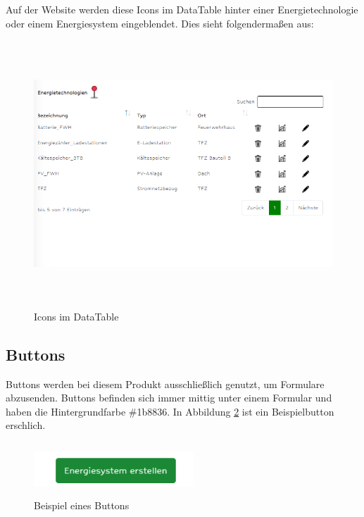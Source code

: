 Auf der Website werden diese Icons im DataTable hinter einer Energietechnologie oder einem Energiesystem eingeblendet. Dies sieht folgendermaßen aus:
\begin{figure}[h]
	\centering
	\includegraphics[height=10cm,width=15cm]{images/IconsImDatatable}
	\caption{Icons im DataTable}
	\label{fig: Icons im Datatable}
\end{figure}


\subsection{Buttons}
Buttons werden bei diesem Produkt ausschließlich genutzt, um Formulare abzusenden. Buttons befinden sich immer mittig unter einem Formular und  haben die Hintergrundfarbe \#1b8836. In Abbildung \ref{fig: Beispiel eines Buttons} \space ist ein Beispielbutton erschlich. 
\begin{figure}[h]
	\centering
	\includegraphics[height=2cm,width=6cm]{images/BeispielButton}
	\caption{Beispiel eines Buttons}
	\label{fig: Beispiel eines Buttons}
\end{figure}
\newpage

